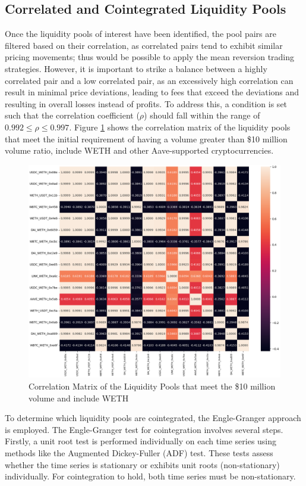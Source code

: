 \subsection{Correlated and Cointegrated Liquidity Pools}
Once the liquidity pools of interest have been identified, the pool pairs are filtered based on their correlation, as correlated pairs tend to exhibit similar pricing movements; thus would be possible to apply the mean reversion trading strategies. However, it is important to strike a balance between a highly correlated pair and a low correlated pair, as an excessively high correlation can result in minimal price deviations, leading to fees that exceed the deviations and resulting in overall losses instead of profits. To address this, a condition is set such that the correlation coefficient ($\rho$) should fall within the range of $0.992 \leq \rho \leq 0.997$. Figure \ref{fig:correlationMatrix} shows the correlation matrix of the liquidity pools that meet the initial requirement of having a volume greater than \$10 million volume ratio, include WETH and other Aave-supported cryptocurrencies.
\begin{figure}[!htb]
    \centering
    \includegraphics[width=\textwidth]{project/Images/correlationMatrix.png}
    \caption{Correlation Matrix of the Liquidity Pools that meet the \$10 million volume and include WETH \label{fig:correlationMatrix}}
\end{figure}
To determine which liquidity pools are cointegrated, the Engle-Granger approach is employed. The Engle-Granger test for cointegration involves several steps. Firstly, a unit root test is performed individually on each time series using methods like the Augmented Dickey-Fuller (ADF) test. These tests assess whether the time series is stationary or exhibits unit roots (non-stationary) individually. For cointegration to hold, both time series must be non-stationary.
